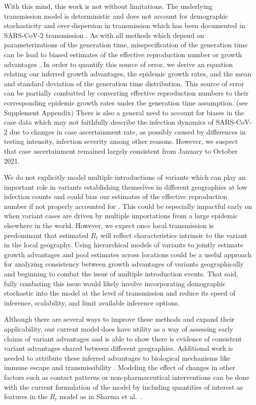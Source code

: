 \documentclass[11pt,oneside,letterpaper]{article}
\begin{document}
With this mind, this work is not without limitations.
The underlying transmission model is deterministic and does not account for demographic stochasticity and over-dispersion in transmission which has been documented in SARS-CoV-2 transmission \cite{Wong29416}.
As with all methods which depend on parameterizations of the generation time, misspecification of the generation time can be lead to biased estimates of the effective reproduction number or growth advantages \cite{Gostic2020}.
In order to quantify this source of error, we derive an equation relating our inferred growth advantages, the epidemic growth rates, and the mean and standard deviation of the generation time distribution.
This source of error can be partially combatted by converting effective reproduction numbers to their corresponding epidemic growth rates under the generation time assumption. (see Supplement Appendix)
There is also a general need to account for biases in the case data which may not faithfully describe the infection dynamics of SARS-CoV-2 due to changes in case ascertainment rate, as possibly caused by differences in testing intensity, infection severity among other reasons.
However, we suspect that case ascertainment remained largely consistent from January to October 2021.

We do not explicitly model multiple introductions of variants which can play an important role in variants establishing themselves in different geographies at low infection counts and could bias our estimates of the effective reproduction number if not properly accounted for \cite{Cori2013, MullerWagner2021}.
This could be especially impactful early on when variant cases are driven by multiple importations from a large epidemic elsewhere in the world.
However, we expect once local transmission is predominant that estimated $R_{t}$ will reflect characteristics intrinsic to the variant in the local geography.
Using hierarchical models of variants to jointly estimate growth advantages and pool estimates across locations could be a useful approach for analyzing consistency between growth advantages of variants geographically and beginning to combat the issue of multiple introduction events.
That said, fully combating this issue would likely involve incorporating demographic stochastic into the model at the level of transmission and reduce its speed of inference, scalability, and limit available inference options.

Although there are several ways to improve these methods and expand their applicability, our current model does have utility as a way of assessing early claims of variant advantages and is able to show there is evidence of consistent variant advantages shared between different geographies.
Additional work is needed to attribute these inferred advantages to biological mechanisms like immune escape and transmissibility \cite{tao2021biological}.
Modeling the effect of changes in other factors such as contact patterns or non-pharmaceutical interventions can be done with the current formulation of the model by including quantities of interest as features in the $R_{t}$ model as in Sharma et al.\ \cite{Sharma2021}.
\end{document}
